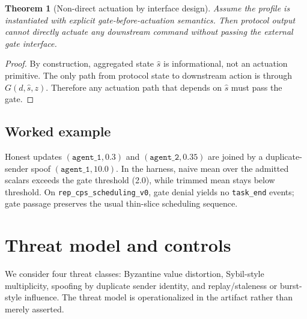 \documentclass[11pt]{article}
\newcommand{\field}[1]{\texttt{#1}}
\newcommand{\code}[1]{\texttt{#1}}
\newtheorem{theorem}{Theorem}
\begin{document}
\begin{theorem}[Non-direct actuation by interface design]
Assume the profile is instantiated with explicit gate-before-actuation semantics. Then protocol output cannot directly actuate any downstream command without passing the external gate interface.
\end{theorem}

\begin{proof}
By construction, aggregated state $\hat{s}$ is informational, not an actuation primitive. The only path from protocol state to downstream action is through $G(d,\hat{s},z)$. Therefore any actuation path that depends on $\hat{s}$ must pass the gate.
\end{proof}

\subsection{Worked example}

Honest updates $(\texttt{agent\_1}, 0.3)$ and $(\texttt{agent\_2}, 0.35)$ are joined by a duplicate-sender spoof $(\texttt{agent\_1}, 10.0)$. In the harness, naive mean over the admitted scalars exceeds the gate threshold (2.0), while trimmed mean stays below threshold. On \code{rep\_cps\_scheduling\_v0}, gate denial yields no \field{task\_end} events; gate passage preserves the usual thin-slice scheduling sequence.

\section{Threat model and controls}

We consider four threat classes: Byzantine value distortion, Sybil-style multiplicity, spoofing by duplicate sender identity, and replay/staleness or burst-style influence. The threat model is operationalized in the artifact rather than merely asserted.
\end{document}
